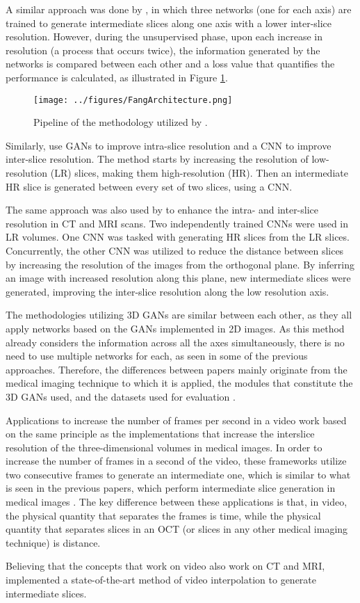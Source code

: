 A similar approach was done by \textcite{Fang2022}, in which three networks (one for each axis) are trained to generate intermediate slices along one axis with a lower inter-slice resolution. However, during the unsupervised phase, upon each increase in resolution (a process that occurs twice), the information generated by the networks is compared between each other and a loss value that quantifies the performance is calculated, as illustrated in Figure \ref{fig:FangArchitecture}.
\begin{figure}[!ht]
	\hspace*{-1.0in}
	\texttt{[image: ../figures/FangArchitecture.png]}
	\caption{Pipeline of the methodology utilized by \textcite{Fang2022}.}
	\label{fig:FangArchitecture}
\end{figure}
\par
Similarly, \textcite{Nimitha2024} use GANs to improve intra-slice resolution and a CNN to improve inter-slice resolution. The method starts by increasing the resolution of low-resolution (LR) slices, making them high-resolution (HR). Then an intermediate HR slice is generated between every set of two slices, using a CNN.
\par
The same approach was also used by \textcite{Georgescu2020} to enhance the intra- and inter-slice resolution in CT and MRI scans. Two independently trained CNNs were used in LR volumes. One CNN was tasked with generating HR slices from the LR slices. Concurrently, the other CNN was utilized to reduce the distance between slices by increasing the resolution of the images from the orthogonal plane. By inferring an image with increased resolution along this plane, new intermediate slices were generated, improving the inter-slice resolution along the low resolution axis.
\par
The methodologies utilizing 3D GANs are similar between each other, as they all apply networks based on the GANs implemented in 2D images. As this method already considers the information across all the axes simultaneously, there is no need to use multiple networks for each, as seen in some of the previous approaches. Therefore, the differences between papers mainly originate from the medical imaging technique to which it is applied, the modules that constitute the 3D GANs used, and the datasets used for evaluation \parencite{YChen2018, Sanchez2018, Kudo2019, Zhang2022}.
\par
Applications to increase the number of frames per second in a video work based on the same principle as the implementations that increase the interslice resolution of the three-dimensional volumes in medical images. In order to increase the number of frames in a second of the video, these frameworks utilize two consecutive frames to generate an intermediate one, which is similar to what is seen in the previous papers, which perform intermediate slice generation in medical images \parencite{Gambini2024}. The key difference between these applications is that, in video, the physical quantity that separates the frames is time, while the physical quantity that separates slices in an OCT (or slices in any other medical imaging technique) is distance.
\par
Believing that the concepts that work on video also work on CT and MRI, \textcite{Gambini2024} implemented a state-of-the-art method of video interpolation \parencite{Huang2022} to generate intermediate slices.

\parencite{Tran2020}
